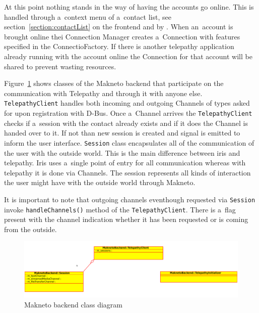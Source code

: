At this point nothing stands in the way of having the accounts go online. This is handled through a~context menu of a~contact list, see section~\ref{section:contactList} on the frontend and by . When an~account is brought online thei Connection Manager creates a~Connection with features specified in the ConnectioFactory. If there is another telepathy application already running with the account online the Connection for that account will be shared to prevent wasting resources. 

Figure~\ref{fig:MaknetoBackendClassDiag} shows classes of the Makneto backend that participate on the communication with Telepathy and through it with anyone else. \verb|TelepathyClient| handles both incoming and outgoing  Channels of types asked for upon registration with D-Bus. Once a~Channel arrives the \verb|TelepathyClient| checks if a~session with the contact already exists and if it does the Channel is handed over to it. If not than new session is created and signal is emitted to inform the user interface. \verb|Session| class encapsulates all of the communication of the user with the outside world. This is the main difference between iris and telepathy. Iris uses a~single point of entry for all communication whereas with telepathy it is done via Channels. The session represents all kinds of interaction the user might have with the outside world through Makneto. 

It is important to note that outgoing channels eventhough requested via \verb|Session| invoke \verb|handleChannels()| method of the \verb|TelepathyClient|. There is a~flag present with the channel indication whether it has been requested or is coming from the outside. 

\begin{figure}[ht]
	\begin{center}
	\includegraphics[width=15cm]{fig/makneto-backend-class-diag.pdf}
	\caption{Makneto backend class diagram}
	\label{fig:MaknetoBackendClassDiag}
\end{center}
\end{figure}

